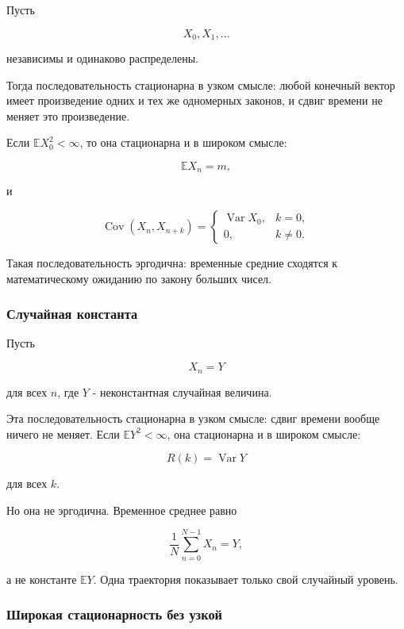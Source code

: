 \documentclass[
  11pt,
  a4paper,
]{article}
\begin{document}
Пусть

\[
X_0,X_1,\ldots
\]

независимы и одинаково распределены.

Тогда последовательность стационарна в узком смысле: любой конечный
вектор имеет произведение одних и тех же одномерных законов, и сдвиг
времени не меняет это произведение.

Если \(\mathbb E X_0^2<\infty\), то она стационарна и в широком смысле:

\[
\mathbb E X_n=m,
\]

и

\[
\operatorname{Cov}(X_n,X_{n+k})=
\begin{cases}
\operatorname{Var}X_0, & k=0,\\
0, & k\ne0.
\end{cases}
\]

Такая последовательность эргодична: временные средние сходятся к
математическому ожиданию по закону больших чисел.

\subsubsection{Случайная
константа}\label{ux441ux43bux443ux447ux430ux439ux43dux430ux44f-ux43aux43eux43dux441ux442ux430ux43dux442ux430}

Пусть

\[
X_n=Y
\]

для всех \(n\), где \(Y\) - неконстантная случайная величина.

Эта последовательность стационарна в узком смысле: сдвиг времени вообще
ничего не меняет. Если \(\mathbb E Y^2<\infty\), она стационарна и в
широком смысле:

\[
R(k)=\operatorname{Var}Y
\]

для всех \(k\).

Но она не эргодична. Временное среднее равно

\[
\frac1N\sum_{n=0}^{N-1}X_n=Y,
\]

а не константе \(\mathbb EY\). Одна траектория показывает только свой
случайный уровень.

\subsubsection{Широкая стационарность без
узкой}\label{ux448ux438ux440ux43eux43aux430ux44f-ux441ux442ux430ux446ux438ux43eux43dux430ux440ux43dux43eux441ux442ux44c-ux431ux435ux437-ux443ux437ux43aux43eux439}
\end{document}
